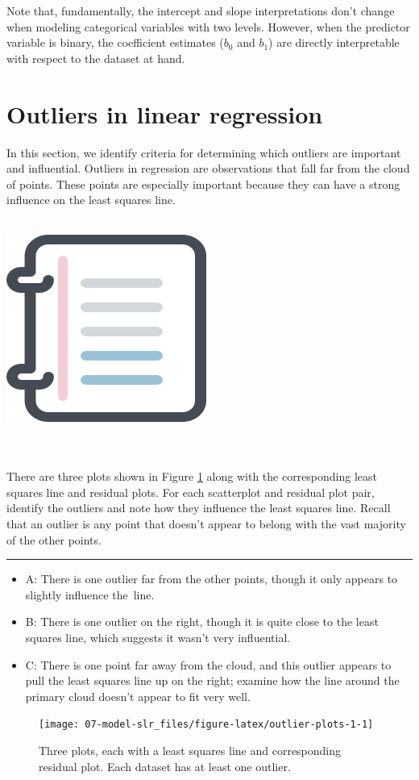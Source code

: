 \documentclass[
  10pt,
  openany]{book}
\newenvironment{mdframedwithfootGPWE}
{   
    \savenotes
    \begin{mdframed}[%
    topline=true, bottomline=true, linecolor=oiB, linewidth=0.5pt,
    rightline=false, leftline=false,
    backgroundcolor=oiLGray]
    \renewcommand{\thempfootnote}{\arabic{footnote}}
    }
{
    \end{mdframed}
    \spewnotes
}
\newenvironment{workedexample}{
    \let\oldrule\rule
    \renewcommand{\rule}[2]{\vspace{-2mm}\oldrule{##1}{##2}\vspace{-2mm}}
\vspace{4mm}
\begin{mdframedwithfootGPWE}
\begin{minipage}[t]{0.10\textwidth}
{$\:$ \\ \setkeys{Gin}{width=2.5em,keepaspectratio}\includegraphics{images/_icons/worked-example.png}}
\end{minipage}
\hfill
\begin{minipage}[t]{0.90\textwidth}
\vspace{-2mm}
\setlength{\parskip}{1em}
\noindent\textbf{\color{oiB}\small\fontfamily{phv}\selectfont{\MakeUppercase{Example}}} $\:$ \\ \\
}{\end{minipage}
\end{mdframedwithfootGPWE}
\vspace{4mm}
}
\begin{document}
Note that, fundamentally, the intercept and slope interpretations don't change when modeling categorical variables with two levels.
However, when the predictor variable is binary, the coefficient estimates (\(b_0\) and \(b_1\)) are directly interpretable with respect to the dataset at hand.

\hypertarget{outliers-in-regression}{%
\section{Outliers in linear regression}\label{outliers-in-regression}}

In this section, we identify criteria for determining which outliers are important and influential.
Outliers in regression are observations that fall far from the cloud of points.
These points are especially important because they can have a strong influence on the least squares line.

\begin{workedexample}

There are three plots shown in Figure \ref{fig:outlier-plots-1} along with the corresponding least squares line and residual plots.
For each scatterplot and residual plot pair, identify the outliers and note how they influence the least squares line.
Recall that an outlier is any point that doesn't appear to belong with the vast majority of the other points.

\begin{center}\rule{0.5\linewidth}{0.5pt}\end{center}

\begin{itemize}
\item
  A: There is one outlier far from the other points, though it only appears to slightly influence the~line.
\item
  B: There is one outlier on the right, though it is quite close to the least squares line, which suggests it wasn't very influential.
\item
  C: There is one point far away from the cloud, and this outlier appears to pull the least squares line up on the right; examine how the line around the primary cloud doesn't appear to fit very well.
\end{itemize}

\end{workedexample}

\begin{figure}[h]

{\centering \texttt{[image: 07-model-slr\_files/figure-latex/outlier-plots-1-1]} 

}

\caption{Three plots, each with a least squares line and corresponding residual plot. Each dataset has at least one outlier.}\label{fig:outlier-plots-1}
\end{figure}
\end{document}
